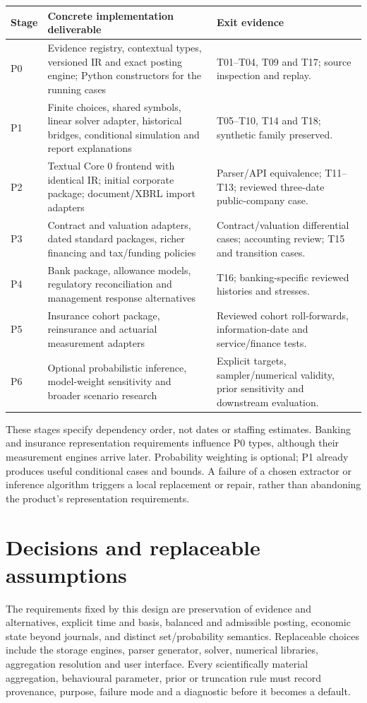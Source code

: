\begin{longtable}{L{16mm}L{76mm}L{44mm}}
\toprule Stage & Concrete implementation deliverable & Exit evidence\\\midrule\endhead
P0 & Evidence registry, contextual types, versioned IR and exact posting engine;
Python constructors for the running cases & T01--T04, T09 and T17; source
inspection and replay.\\
P1 & Finite choices, shared symbols, linear solver adapter, historical bridges,
conditional simulation and report explanations & T05--T10, T14 and T18;
synthetic family preserved.\\
P2 & Textual Core 0 frontend with identical IR; initial corporate package;
document/XBRL import adapters & Parser/API equivalence; T11--T13; reviewed
three-date public-company case.\\
P3 & Contract and valuation adapters, dated standard packages, richer financing
and tax/funding policies & Contract/valuation differential cases; accounting
review; T15 and transition cases.\\
P4 & Bank package, allowance models, regulatory reconciliation and management
response alternatives & T16; banking-specific reviewed histories and stresses.\\
P5 & Insurance cohort package, reinsurance and actuarial measurement adapters &
Reviewed cohort roll-forwards, information-date and service/finance tests.\\
P6 & Optional probabilistic inference, model-weight sensitivity and broader
scenario research & Explicit targets, sampler/numerical validity, prior
sensitivity and downstream evaluation.\\\bottomrule
\end{longtable}

These stages specify dependency order, not dates or staffing estimates.
Banking and insurance representation requirements influence P0 types, although
their measurement engines arrive later. Probability weighting is optional;
P1 already produces useful conditional cases and bounds. A failure of a chosen
extractor or inference algorithm triggers a local replacement or repair,
rather than abandoning the product's representation requirements.

\section{Decisions and replaceable assumptions}

The requirements fixed by this design are preservation of evidence and
alternatives, explicit time and basis, balanced and admissible posting, economic
state beyond journals, and distinct set/probability semantics. Replaceable
choices include the storage engines, parser generator, solver, numerical
libraries, aggregation resolution and user interface. Every scientifically
material aggregation, behavioural parameter, prior or truncation rule must
record provenance, purpose, failure mode and a diagnostic before it becomes a
default.

